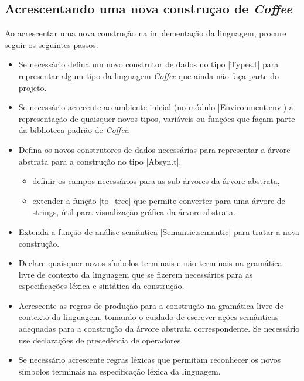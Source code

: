 \documentclass[a4paper,11pt,brazil]{article}
\newcommand{\lang}{\textsl{Coffee}}
\begin{document}
\subsection{Acrescentando uma nova construçao de \lang{} }

Ao acrescentar uma nova construção na implementação da linguagem, procure
seguir os seguintes passos:
\begin{itemize}
  \item Se necessário defina um novo construtor de dados no tipo
  \pyginline|Types.t| para representar algum tipo da linguagem \lang{}
  que ainda não faça parte do projeto.

  \item Se necessário acrecente ao ambiente inicial (no módulo
  \pyginline|Environment.env|) a representação de quaisquer novos
  tipos, variáveis ou funções que façam parte da biblioteca padrão de
  \lang{}.

  \item Defina os novos construtores de dados necessárias para
  representar a árvore abstrata para a construção no tipo
  \pyginline|Absyn.t|.
  \begin{itemize}
    \item definir os campos necessários para as sub-árvores da árvore
    abstrata,
    \item extender a função \pyginline|to_tree| que permite converter
    para uma árvore de strings, útil para visualização gráfica da
    árvore abstrata.
  \end{itemize}

  \item Extenda a função de análise semântica
  \pyginline|Semantic.semantic| para tratar a nova construção.

  \item Declare quaisquer novos símbolos terminais e não-terminais na
  gramática livre de contexto da linguagem que se fizerem necessários
  para as especificações léxica e sintática da construção.

  \item Acrescente as regras de produção para a construção na gramática livre
  de contexto da linguagem, tomando o cuidado de escrever ações semânticas
  adequadas para a construção da árvore abstrata correspondente. Se necessário
  use declarações de precedência de operadores.

  \item Se necessário acrescente regras léxicas que permitam reconhecer os
  novos símbolos terminais na especificação léxica da linguagem.
\end{itemize}
\end{document}
